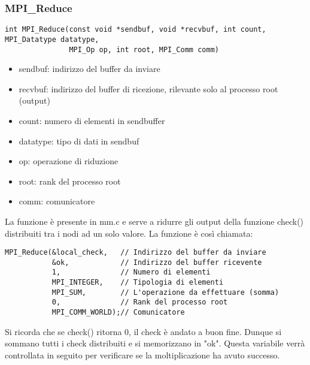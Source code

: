 \subsubsection{MPI\_Reduce}
\begin{lstlisting}
int MPI_Reduce(const void *sendbuf, void *recvbuf, int count, MPI_Datatype datatype,
               MPI_Op op, int root, MPI_Comm comm)
\end{lstlisting}
\begin{itemize}
  \item sendbuf: indirizzo del buffer da inviare
  \item recvbuf: indirizzo del buffer di ricezione, rilevante solo al processo root (output)
  \item count: numero di elementi in sendbuffer
  \item datatype: tipo di dati in sendbuf
  \item op: operazione di riduzione
  \item root: rank del processo root
  \item comm: comunicatore
\end{itemize}

La funzione \`{e} presente in mm.c e serve a ridurre gli output della funzione check() distribuiti tra i nodi ad un solo valore. La funzione \`{e} cos\`{i} chiamata:

\begin{lstlisting}
MPI_Reduce(&local_check,   // Indirizzo del buffer da inviare
           &ok,            // Indirizzo del buffer ricevente
           1,              // Numero di elementi
           MPI_INTEGER,    // Tipologia di elementi
           MPI_SUM,        // L'operazione da effettuare (somma)
           0,              // Rank del processo root
           MPI_COMM_WORLD);// Comunicatore
\end{lstlisting}

Si ricorda che se check() ritorna 0, il check \`{e} andato a buon fine. Dunque si sommano tutti i check distribuiti e si memorizzano in "ok". Questa variabile verr\`{a} controllata in seguito per verificare se la moltiplicazione ha avuto successo.

